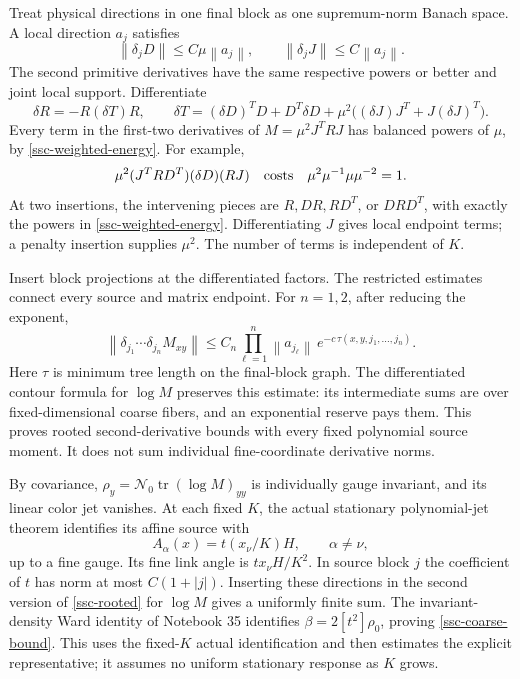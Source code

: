 \documentclass[11pt]{article}
\newcommand{\norm}[1]{\left\lVert#1\right\rVert}
\theoremstyle{remark}
\begin{document}
Treat physical directions in one final block as one supremum-norm
Banach space. A local direction \(a_j\) satisfies
\[
 \norm{\delta_jD}\le C\mu\norm{a_j},\qquad
 \norm{\delta_jJ}\le C\norm{a_j}.
\]
The second primitive derivatives have the same respective powers
or better and joint local support. Differentiate
\[
 \delta R=-R(\delta T)R,\qquad
 \delta T=(\delta D)^TD+D^T\delta D+
       \mu^2\bigl((\delta J)J^T+J(\delta J)^T\bigr).
\]
Every term in the first-two derivatives of
\(M=\mu^2J^TRJ\) has balanced powers of \(\mu\), by
\eqref{ssc-weighted-energy}. For example,
\[
 \mu^2(J^TRD^T)(\delta D)(RJ)
 \quad\hbox{costs}\quad
 \mu^2\mu^{-1}\mu\mu^{-2}=1.
\]
At two insertions, the intervening pieces are \(R,DR,RD^T\),
or \(DRD^T\), with exactly the powers in
\eqref{ssc-weighted-energy}. Differentiating \(J\) gives local
endpoint terms; a penalty insertion supplies \(\mu^2\).
The number of terms is independent of \(K\).

Insert block projections at the differentiated factors. The
restricted estimates connect every source and matrix endpoint.
For \(n=1,2\), after reducing the exponent,
\begin{equation}
 \norm{\delta_{j_1}\cdots\delta_{j_n}M_{xy}}
 \le C_n\prod_{\ell=1}^n\norm{a_{j_\ell}}\,
     e^{-c\,\tau(x,y,j_1,\ldots,j_n)} .
 \label{ssc-rooted}
\end{equation}
Here \(\tau\) is minimum tree length on the final-block graph.
The differentiated contour formula for \(\log M\) preserves this
estimate: its intermediate sums are over fixed-dimensional coarse
fibers, and an exponential reserve pays them. This proves rooted
second-derivative bounds with every fixed polynomial source moment.
It does not sum individual fine-coordinate derivative norms.

By covariance, \(\rho_y=\mathcal N_0\operatorname{tr}
(\log M)_{yy}\) is individually gauge invariant, and its linear
color jet vanishes. At each fixed \(K\), the actual stationary
polynomial-jet theorem identifies its affine source with
\[
 A_\alpha(x)=t(x_\nu/K)H,\qquad \alpha\ne\nu ,
\]
up to a fine gauge. Its fine link angle is \(t x_\nu H/K^2\).
In source block \(j\) the coefficient of \(t\) has norm at most
\(C(1+|j|)\). Inserting these directions in the second version of
\eqref{ssc-rooted} for \(\log M\) gives a uniformly finite sum.
The invariant-density Ward identity of Notebook 35 identifies
\(\beta=2[t^2]\rho_0\), proving \eqref{ssc-coarse-bound}.
This uses the fixed-\(K\) actual identification and then estimates
the explicit representative; it assumes no uniform stationary
response as \(K\) grows.
\end{document}
